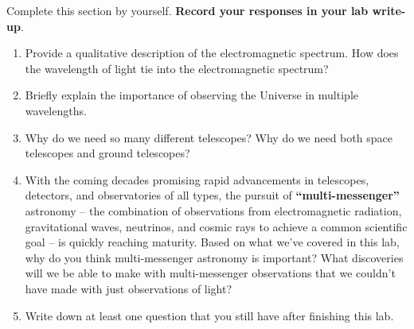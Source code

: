 \documentclass[11pt]{article}
\begin{document}
Complete this section by yourself. \textbf{Record your responses in your lab write-up}.
\begin{enumerate}
    \item Provide a qualitative description of the electromagnetic spectrum. How does the wavelength of light tie into the electromagnetic spectrum?
    
    \item Briefly explain the importance of observing the Universe in multiple wavelengths. 
    
    \item Why do we need so many different telescopes? Why do we need both space telescopes and ground telescopes?
    
    \item With the coming decades promising rapid advancements in telescopes, detectors, and observatories of all types, the pursuit of \textbf{``multi-messenger''} astronomy -- the combination of observations from electromagnetic radiation, gravitational waves, neutrinos, and cosmic rays to achieve a common scientific goal -- is quickly reaching maturity. Based on what we've covered in this lab, why do you think multi-messenger astronomy is important? What discoveries will we be able to make with multi-messenger observations that we couldn't have made with just observations of light?  
    
    \item Write down at least one question that you still have after finishing this lab.
    
\end{enumerate}
\end{document}
